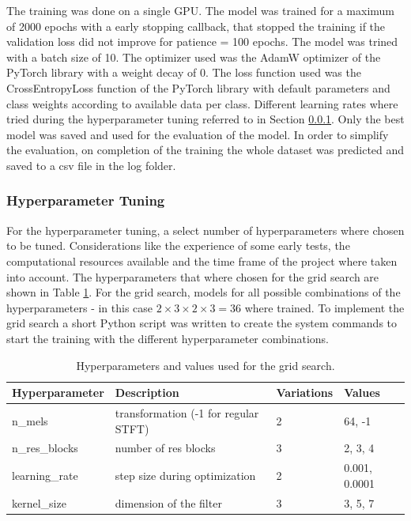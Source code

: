 The training was done on a single GPU. The model was trained for a maximum of 2000 epochs
with a early stopping callback, that stopped the training if the validation loss did not improve
for patience = 100 epochs. The model was trined with a batch size of 10. The optimizer used was the AdamW
optimizer of the PyTorch library with a weight decay of 0. The loss function used was the
CrossEntropyLoss function of the PyTorch library with default parameters and class weights
according to available data per class. Different learning rates where tried during the hyperparameter
tuning referred to in Section \ref{hyperparameter_tuning}. Only the best model was saved and used for
the evaluation of the model. In order to simplify the evaluation, on completion of the training
the whole dataset was predicted and saved to a csv file in the log folder.

\subsubsection{Hyperparameter Tuning}
\label{hyperparameter_tuning}

For the hyperparameter tuning, a select number of hyperparameters where chosen to be tuned.
Considerations like the experience of some early tests, the computational resources available
and the time frame of the project where taken into account. The hyperparameters that where
chosen for the grid search are shown in Table \ref{tab:hyperparameters}. For the grid search,
models for all possible combinations of the hyperparameters - 
in this case \( 2 \times 3 \times 2 \times 3 = 36 \) where trained. To implement the grid search a short Python
script was written to create the system commands to start the training with the different
hyperparameter combinations.
\begin{table}[h]
    \centering
    \caption{Hyperparameters and values used for the grid search.}
    \label{tab:hyperparameters}
    \begin{tabular}{|l|l|l|l|}
    \hline
    \textbf{Hyperparameter} & \textbf{Description}                  & \textbf{Variations}   & \textbf{Values} \\ \hline
    n\_mels                 & transformation (-1 for regular STFT)  & 2                     & 64, -1 \\ \hline
    n\_res\_blocks          & number of res blocks                  & 3                     & 2, 3, 4 \\ \hline
    learning\_rate          & step size during optimization         & 2                     & 0.001, 0.0001 \\ \hline
    kernel\_size            & dimension of the filter               & 3                     & 3, 5, 7 \\ \hline
    \end{tabular}

\end{table}

